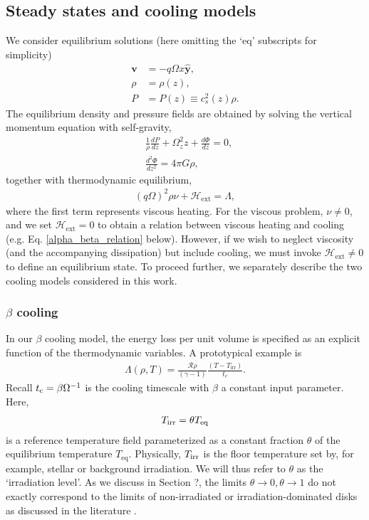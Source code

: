 \subsection{Steady states and cooling models}
We consider equilibrium solutions (here omitting the `eq' subscripts
for simplicity)  
\begin{align}
  \bm{v} &= -q\Omega x \hat{\bm{y}}, \\
  \rho   &= \rho(z),\\
  P      &= P(z) \equiv c_s^2(z)\rho.
\end{align} 
The equilibrium density and pressure fields are obtained by solving
the vertical momentum equation with self-gravity,
\begin{align}
  &\frac{1}{\rho}\frac{dP}{dz} +
  \Omega_z^2z + \frac{d\Phi}{dz} = 0, \label{vert_eq1}\\
 &\frac{d^2\Phi}{dz^2} = 4 \pi G \rho,\label{vert_eq2}
\end{align}
together with thermodynamic equilibrium,
\begin{align}\label{thermal_eq}
(q\Omega)^2\rho\nu + \mathcal{H}_\mathrm{ext} = \Lambda,
\end{align}
where the first term represents viscous heating. For the viscous
problem, $\nu\neq0$, and we set $\mathcal{H}_\mathrm{ext}=0$ to 
obtain a relation between viscous heating and cooling 
(e.g. Eq. \ref{alpha_beta_relation} below). However,
if we wish to neglect viscosity (and the accompanying dissipation) but include cooling, we must invoke
$\mathcal{H}_\mathrm{ext}\neq0$ to define an equilibrium state.  
To proceed further, we separately describe the two cooling models
considered in this work. 



\subsubsection{$\beta$ cooling}\label{beta_cool_model}
In our $\beta$ cooling model, the energy loss per unit volume is specified  
as an explicit function of the thermodynamic variables. 
A prototypical example is 
\begin{align}\label{beta_cool}
  \Lambda(\rho, T) =
  \frac{\mathcal{R}\rho}{(\gamma-1)}\frac{\left(T-T_\mathrm{irr}\right)}{t_c}. 
\end{align}
Recall  $t_\mathrm{c} = \beta\Omega^{-1}$ is 
the cooling timescale with $\beta$ a constant input parameter. Here, 
\begin{align}\label{tirr_def}
  T_\mathrm{irr} = \theta T_\mathrm{eq}
\end{align}
is a reference temperature field parameterized as a constant 
fraction $\theta$ of the equilibrium temperature
$T_\mathrm{eq}$. Physically, $T_\mathrm{irr}$ is the floor temperature set by,
for example, stellar or background irradiation. We will thus refer to
$\theta$ as the `irradiation level'. As we discuss in Section ?, 
the limits $\theta \rightarrow 0, \theta \rightarrow 1$ do not exactly 
correspond to the limits of non-irradiated or irradiation-dominated disks
as discussed in the literature \citep{kratter11,rice11}.%

